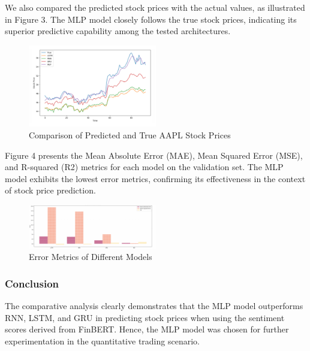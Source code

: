 \documentclass[11pt,a4paper]{article}
\begin{document}
  We also compared the predicted stock prices with the actual values, as illustrated in Figure 3. The MLP model closely follows the true stock prices, indicating its superior predictive capability among the tested architectures.
  
  \begin{figure}[ht]
  \centering
  \includegraphics[width=0.5\textwidth]{figs/2023-11-30_161316.jpg}
  \caption{Comparison of Predicted and True AAPL Stock Prices}
  \label{fig:prediction_comparison}
  \end{figure}
  
  Figure 4 presents the Mean Absolute Error (MAE), Mean Squared Error (MSE), and R-squared (R2) metrics for each model on the validation set. The MLP model exhibits the lowest error metrics, confirming its effectiveness in the context of stock price prediction.
  
  \begin{figure}[ht]
  \centering
  \includegraphics[width=0.5\textwidth]{figs/2023-11-29_230902.jpg}
  \caption{Error Metrics of Different Models}
  \label{fig:error_comparison}
  \end{figure}
  
  \subsubsection{Conclusion}
  The comparative analysis clearly demonstrates that the MLP model outperforms RNN, LSTM, and GRU in predicting stock prices when using the sentiment scores derived from FinBERT. Hence, the MLP model was chosen for further experimentation in the quantitative trading scenario.
  
\end{document}
